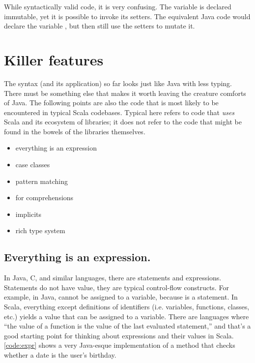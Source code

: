 \documentclass[10 pt]{article}
\begin{document}
While syntactically valid code, it is very confusing. The  variable is declared immutable, yet it is possible to invoke its setters. The equivalent Java code would declare the  variable , but then still use the setters to mutate it.

\newpage
\section{Killer features}
The syntax (and its application) so far looks just like Java with less typing. There must be something else that makes it worth leaving the creature comforts of Java. The following points are also the code that is most likely to be encountered in typical Scala codebases. Typical here refers to code that \emph{uses} Scala and its ecosystem of libraries; it does not refer to the code that might be found in the bowels of the libraries themselves.

\begin{itemize}
  \item everything is an expression
  \item case classes
  \item pattern matching
  \item for comprehensions
  \item implicits
  \item rich type system
\end{itemize}

\subsection{Everything is an expression.} 
In Java, C, and similar languages, there are statements and expressions. Statements do not have value, they are typical control-flow constructs. For example, in Java,  cannot be assigned to a variable, because  is a statement. In Scala, everything except definitions of identifiers (i.e. variables, functions, classes, etc.) yields a value that can be assigned to a variable. There are languages where ``the value of a function is the value of the last evaluated statement,'' and that's a good starting point for thinking about expressions and their values in Scala. \autoref{code:expr} shows a very Java-esque implementation of a method that checks whether a date is the user's birthday. 
\end{document}
